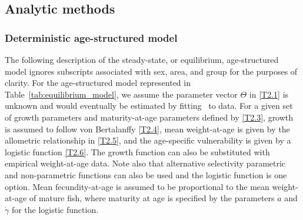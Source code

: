 \subsection{Analytic methods} %
\label{sub:analytical_methods}


\subsubsection{Deterministic age-structured model} %
\label{ssub:deterministic_age_structured_model}



The following description of the steady-state, or equilibrium, age-structured model ignores subscripts associated with sex, area, and group for the purposes of clarity. For the age-structured model represented in Table~\ref{tab:equilibrium_model}, we assume the parameter vector $\Theta$ in \eqref{T2.1} is unknown and would eventually be estimated by fitting \iscam\ to data.  For a given set of growth parameters and maturity-at-age parameters defined by \eqref{T2.3}, growth is assumed to follow von Bertalanffy \eqref{T2.4}, mean weight-at-age is given by the allometric relationship in \eqref{T2.5}, and the age-specific vulnerability is given by a logistic function \eqref{T2.6}.  The growth function can also be substituted with empirical weight-at-age data.  Note also that alternative selectivity parametric and non-parametric functions can also be used and the logistic function is one option.  Mean fecundity-at-age is assumed to be proportional to the mean weight-at-age of mature fish, where maturity at age is specified by the parameters $\dot{a}$ and $\dot{\gamma}$ for the logistic function.  



